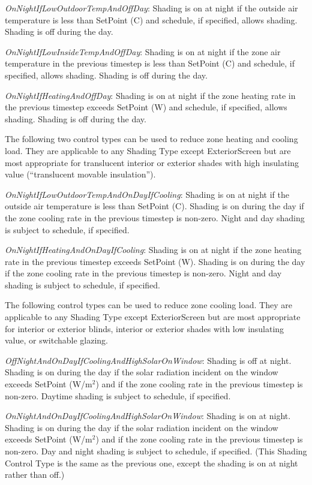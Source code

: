 \emph{OnNightIfLowOutdoorTempAndOffDay}: Shading is on at night if the outside air temperature is less than SetPoint (C) and schedule, if specified, allows shading. Shading is off during the day.

\emph{OnNightIfLowInsideTempAndOffDay}: Shading is on at night if the zone air temperature in the previous timestep is less than SetPoint (C) and schedule, if specified, allows shading. Shading is off during the day.

\emph{OnNightIfHeatingAndOffDay}: Shading is on at night if the zone heating rate in the previous timestep exceeds SetPoint (W) and schedule, if specified, allows shading. Shading is off during the day.

The following two control types can be used to reduce zone heating and cooling load. They are applicable to any Shading Type except ExteriorScreen but are most appropriate for translucent interior or exterior shades with high insulating value (``translucent movable insulation'').

\emph{OnNightIfLowOutdoorTempAndOnDayIfCooling}: Shading is on at night if the outside air temperature is less than SetPoint (C). Shading is on during the day if the zone cooling rate in the previous timestep is non-zero. Night and day shading is subject to schedule, if specified.

\emph{OnNightIfHeatingAndOnDayIfCooling}: Shading is on at night if the zone heating rate in the previous timestep exceeds SetPoint (W). Shading is on during the day if the zone cooling rate in the previous timestep is non-zero. Night and day shading is subject to schedule, if specified.

The following control types can be used to reduce zone cooling load. They are applicable to any Shading Type except ExteriorScreen but are most appropriate for interior or exterior blinds, interior or exterior shades with low insulating value, or switchable glazing.

\emph{OffNightAndOnDayIfCoolingAndHighSolarOnWindow}: Shading is off at night. Shading is on during the day if the solar radiation incident on the window exceeds SetPoint (W/m\(^{2}\)) and if the zone cooling rate in the previous timestep is non-zero. Daytime shading is subject to schedule, if specified.

\emph{OnNightAndOnDayIfCoolingAndHighSolarOnWindow}: Shading is on at night. Shading is on during the day if the solar radiation incident on the window exceeds SetPoint (W/m\(^{2}\)) and if the zone cooling rate in the previous timestep is non-zero. Day and night shading is subject to schedule, if specified. (This Shading Control Type is the same as the previous one, except the shading is on at night rather than off.)


